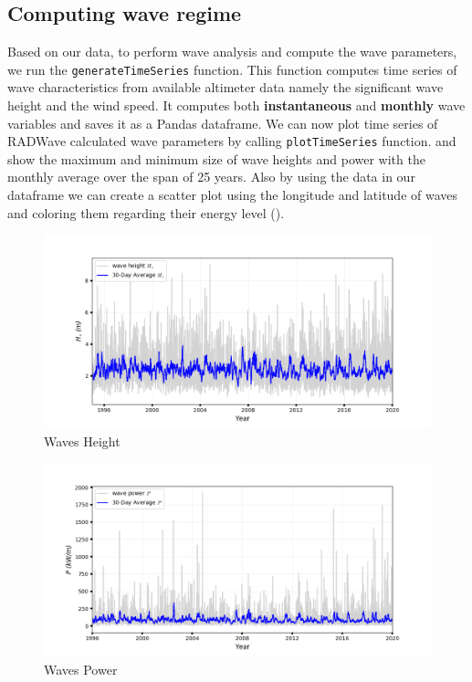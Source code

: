 \documentclass[12pt]{article}
\begin{document}
\subsection{Computing wave regime}
Based on our data, to perform wave analysis and compute the wave parameters, we run the \texttt{generateTimeSeries} function. This function computes time series of wave characteristics from available altimeter data namely the significant wave height and the wind speed. It computes both \textbf{instantaneous} and \textbf{monthly} wave variables and saves it as a Pandas dataframe. We can now plot time series of RADWave calculated wave parameters by calling \texttt{plotTimeSeries} function.
 and  show the maximum and minimum size of wave heights and power with the monthly average over the span of 25 years. Also by using the data in our dataframe we can create a scatter plot using the longitude and latitude of waves and coloring them regarding their energy level ().
\newpage

\begin{figure}[h]
    \centering
    \includegraphics[scale=0.31]{Hseries.png}
    \caption{Waves Height}
    \label{fig:fig2}
\end{figure}

\begin{figure}[h]
    \centering
    \includegraphics[scale=0.31]{Pseries.png}
    \caption{Waves Power}
    \label{fig:fig3}
\end{figure}
\end{document}
